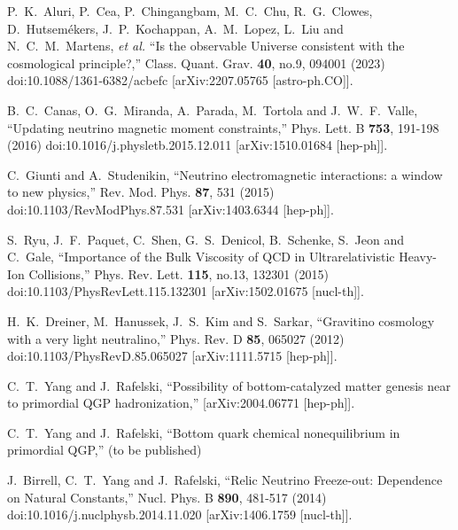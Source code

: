 \documentclass[universe,article,submit,moreauthors,pdftex,a4paper]{Definitions/mdpi}
\begin{document}
\begin{thebibliography}{99}
P.~K.~Aluri, P.~Cea, P.~Chingangbam, M.~C.~Chu, R.~G.~Clowes, D.~Hutsem\'ekers, J.~P.~Kochappan, A.~M.~Lopez, L.~Liu and N.~C.~M.~Martens, \textit{et al.}
``Is the observable Universe consistent with the cosmological principle?,''
Class. Quant. Grav. \textbf{40}, no.9, 094001 (2023)
doi:10.1088/1361-6382/acbefc
[arXiv:2207.05765 [astro-ph.CO]].

B.~C.~Canas, O.~G.~Miranda, A.~Parada, M.~Tortola and J.~W.~F.~Valle,
``Updating neutrino magnetic moment constraints,''
Phys. Lett. B \textbf{753}, 191-198 (2016)
doi:10.1016/j.physletb.2015.12.011
[arXiv:1510.01684 [hep-ph]].

C.~Giunti and A.~Studenikin,
``Neutrino electromagnetic interactions: a window to new physics,''
Rev. Mod. Phys. \textbf{87}, 531 (2015)
doi:10.1103/RevModPhys.87.531
[arXiv:1403.6344 [hep-ph]].

S.~Ryu, J.~F.~Paquet, C.~Shen, G.~S.~Denicol, B.~Schenke, S.~Jeon and C.~Gale,
``Importance of the Bulk Viscosity of QCD in Ultrarelativistic Heavy-Ion Collisions,''
Phys. Rev. Lett. \textbf{115}, no.13, 132301 (2015)
doi:10.1103/PhysRevLett.115.132301
[arXiv:1502.01675 [nucl-th]].

H.~K.~Dreiner, M.~Hanussek, J.~S.~Kim and S.~Sarkar,
``Gravitino cosmology with a very light neutralino,''
Phys. Rev. D \textbf{85}, 065027 (2012)
doi:10.1103/PhysRevD.85.065027
[arXiv:1111.5715 [hep-ph]].

C.~T.~Yang and J.~Rafelski,
``Possibility of bottom-catalyzed matter genesis near to primordial QGP hadronization,''
[arXiv:2004.06771 [hep-ph]].

C.~T.~Yang and J.~Rafelski,
``Bottom quark chemical nonequilibrium in primordial QGP,'' (to be published)


J.~Birrell, C.~T.~Yang and J.~Rafelski,
``Relic Neutrino Freeze-out: Dependence on Natural Constants,''
Nucl. Phys. B \textbf{890}, 481-517 (2014)
doi:10.1016/j.nuclphysb.2014.11.020
[arXiv:1406.1759 [nucl-th]].


\end{thebibliography}
\end{document}
